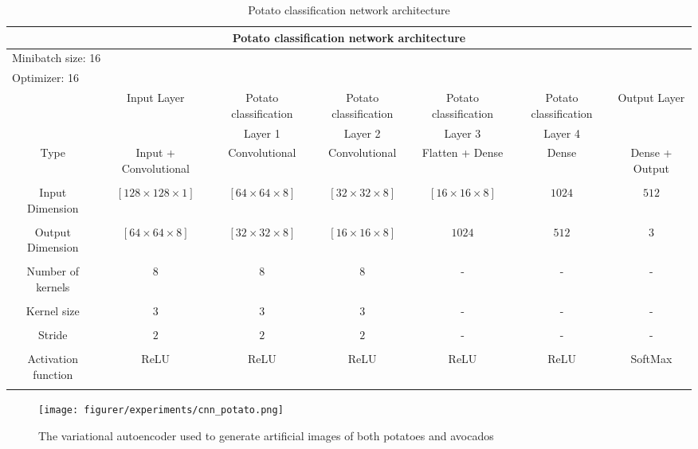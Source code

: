 \documentclass[11pt]{article}
\begin{document}
  \begin{table}[h!]
  \centering
  \begin{adjustbox}{max width=\textwidth}
  \begin{tabular}{*{7}{c}}%
  \hline
  \multicolumn{7}{c}{Potato classification network architecture}
  \\
  \hline
  \multicolumn{7}{l}{Minibatch size: 16} \\
  \multicolumn{7}{l}{Optimizer: 16} \\
  \hline
   & Input Layer & Potato classification & Potato classification & Potato classification & Potato classification & Output Layer \\
   & & Layer 1 & Layer 2 & Layer 3 & Layer 4 & \\
  \hline
  \hline
  Type & Input + Convolutional & Convolutional & Convolutional &  Flatten + Dense &  Dense & Dense + Output \\ \\
  \hline
  Input Dimension &  $[128 \times 128 \times 1]$ &  $[64 \times 64 \times 8]$ &  $[32 \times 32 \times 8]$ &  $[16 \times 16 \times 8]$ & $1024$ & $512$\\ \\
  \hline
  Output Dimension & $[64 \times 64 \times 8]$ &  $[32 \times 32 \times 8]$ &  $[16 \times 16 \times 8]$ & $1024$ & $512$ & $3$ \\ \\
  \hline
  Number of kernels & $8$ & $8$ & $8$ & - & - & - \\ \\
  \hline
  Kernel size & $3$ & $3$ & $3$ & - & - & - \\ \\
  \hline
  Stride & $2$ & $2$ & $2$ & - & - & - \\ \\
  \hline
  Activation function & ReLU & ReLU & ReLU & ReLU & ReLU & SoftMax \\ \\
  \hline
\end{tabular}
\end{adjustbox}
  \caption{Potato classification network architecture}
  \label{tab:experiments_potato_cnn}
\end{table}




\begin{figure}[!h]
    \centering
    \texttt{[image: figurer/experiments/cnn\_potato.png]}
    \caption{The variational autoencoder used to generate artificial images of both potatoes and avocados}
    \label{fig:experiment_cnn_potato}
\end{figure}
\end{document}
